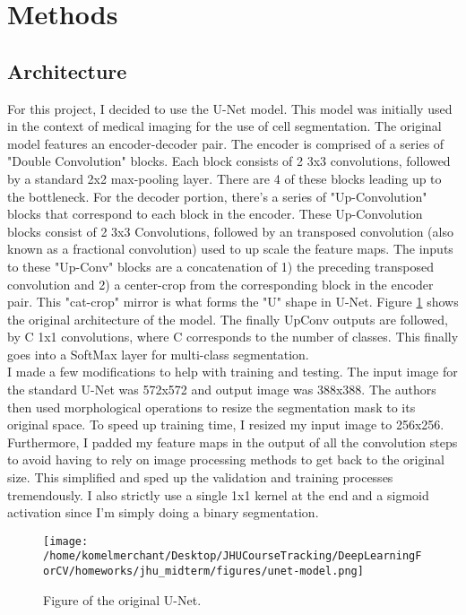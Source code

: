 \documentclass[Location Location Location! : Exploring Image Segmentation Problem In Urban Driving Scenarios]{IEEEtran}
\begin{document}
\section{Methods}

\subsection{Architecture} 
For this project, I decided to use the U-Net model. This model was initially used in the context of medical imaging for the use of cell segmentation. The original model features an encoder-decoder pair. The encoder is comprised of a series of "Double Convolution" blocks. Each block consists of 2 3x3 convolutions, followed by a standard 2x2 max-pooling layer. There are 4 of these blocks leading up to the bottleneck. For the decoder portion, there's a series of "Up-Convolution" blocks that correspond to each block in the encoder. These Up-Convolution blocks consist of 2 3x3 Convolutions, followed by an transposed convolution (also known as a fractional convolution) used to up scale the feature maps. The inputs to these "Up-Conv" blocks are a concatenation of 1) the preceding transposed convolution and 2) a center-crop from the corresponding block in the encoder pair. This "cat-crop" mirror is what forms the "U" shape in U-Net. Figure \ref{unet} shows the original architecture of the model. The finally UpConv outputs are followed, by C 1x1 convolutions, where C corresponds to the number of classes. This finally goes into a SoftMax layer for multi-class segmentation. \\   

 
I made a few modifications to help with training and testing. The input image for the standard U-Net was 572x572 and output image was 388x388. The authors \cite{unet} then used morphological operations to resize the segmentation mask to its original space. To speed up training time, I resized my input image to 256x256. Furthermore, I padded my feature maps in the output of all the convolution steps to avoid having to rely on image processing methods to get back to the original size. This simplified and sped up the validation and training processes tremendously. I also strictly use a single 1x1 kernel at the end and a sigmoid activation since I'm simply doing a binary segmentation.  


\begin{figure}[htbp]
\centerline{\texttt{[image: /home/komelmerchant/Desktop/JHUCourseTracking/DeepLearningForCV/homeworks/jhu\_midterm/figures/unet-model.png]}}
\caption{Figure of the original U-Net.}
\label{unet}
\end{figure}
\end{document}
